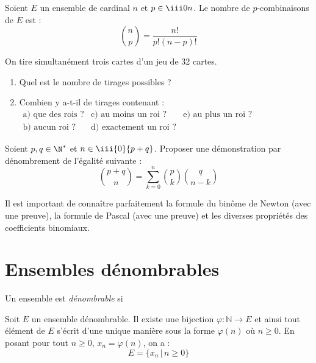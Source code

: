 \documentclass[french,11pt,twoside]{VcCours}
\begin{document}
\begin{Proposition}{} Soient $E$ un ensemble de cardinal $n$ et $p \in \iii 0n$. Le nombre de $p$-combinaisons de $E$ est :
$$\binom{n}{p}  = \frac{n!}{p!(n-p)!}$$
\end{Proposition}

\begin{Exemple} On tire simultanément trois cartes d'un jeu de 32 cartes.
\begin{enumerate}
\item Quel est le nombre de tirages possibles ?

\vspace{2cm}
\newpage
\item Combien y a-t-il de tirages contenant :\\
$\begin{array}{lll}
\text{a) que des rois ?} & \text{c) au moins un roi ?} & \text{e) au plus un roi ?}\\
\text{b) aucun roi ?} & \text{d) exactement un roi ?} &
\end{array}$
\end{enumerate}

\vspace{7cm}
\end{Exemple}

\begin{ApplicationDirecte}{} Soient $p,q \in \N^*$ et $n \in \iii{0}{p+q}$. Proposer une démonstration par dénombrement de l'égalité suivante :
  \[
  \binom{p + q}{n} = \sum_{k = 0}^{n} \binom{p}{k}\binom{q}{n - k}
  \]
\end{ApplicationDirecte}

\begin{Remarque}{} Il est important de connaître parfaitement la formule du binôme de Newton (avec une preuve), la formule de Pascal (avec une preuve) et les diverses propriétés des coefficients binomiaux.
\end{Remarque}

\section{Ensembles dénombrables}


\begin{Definition}{} Un ensemble est \emph{dénombrable} si 
\end{Definition}

\begin{Remarque}{} Soit $E$ un ensemble dénombrable. Il existe une bijection $\varphi : \mathbb{N} \rightarrow E$ et ainsi tout élément de $E$ s'écrit d'une unique manière sous la forme $\varphi(n)$ où $n \geq 0$. En posant pour tout $n \geq 0$, $x_n= \varphi(n)$, on a :
$$ E = \lbrace x_n \, \vert \, n \geq 0 \rbrace$$
\end{Remarque}
\end{document}
